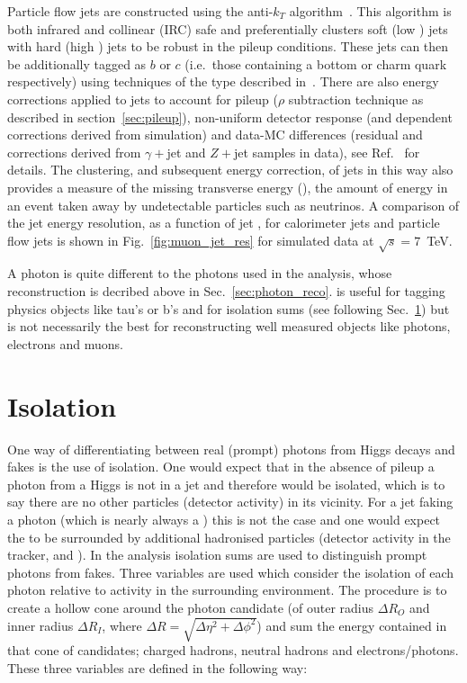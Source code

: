 Particle flow jets are constructed using the anti-$k_{T}$ algorithm~\cite{anti_kt_algo}. This algorithm is both infrared and collinear (IRC) safe and preferentially clusters soft (low \pT) jets with hard (high \pT) jets to be robust in the \LHC pileup conditions. These jets can then be additionally tagged as $b$ or $c$ (i.e.~those containing a bottom or charm quark respectively) using techniques of the type described in~\cite{b_tag}. There are also energy corrections applied to jets to account for pileup ($\rho$ subtraction technique as described in section~\ref{sec:pileup}), non-uniform detector response (\pT and \eta dependent corrections derived from \MC simulation) and data-MC differences (residual \pT and \eta corrections derived from $\gamma+$jet and $Z+$jet samples in data), see Ref.~\cite{jet_e_corrs} for details. The clustering, and subsequent energy correction, of jets in this way also provides a measure of the missing transverse energy (\MET), the amount of energy in an event taken away by undetectable particles such as neutrinos. A comparison of the jet energy resolution, as a function of jet \pT, for calorimeter jets and particle flow jets is shown in Fig.~\ref{fig:muon_jet_res} for simulated data at $\sqrt{s}=7$~TeV.

A \PF photon is quite different to the photons used in the analysis, whose reconstruction is decribed above in Sec.~\ref{sec:photon_reco}. \PF is useful for tagging physics objects like tau's or b's and for isolation sums (see following Sec.~\ref{sec:iso}) but is not necessarily the best for reconstructing well measured objects like photons, electrons and muons.

\section{Isolation}
\label{sec:iso}

One way of differentiating between real (prompt) photons from Higgs decays and fakes is the use of isolation. One would expect that in the absence of pileup a photon from a Higgs is not in a jet and therefore would be isolated, which is to say there are no other particles (detector activity) in its vicinity. For a jet faking a photon (which is nearly always a \pizero) this is not the case and one would expect the \pizero to be surrounded by additional hadronised particles (detector activity in the tracker, \ECAL and \HCAL). In the \CMS \Hgg analysis isolation sums are used to distinguish prompt photons from fakes. Three variables are used which consider the isolation of each photon relative to activity in the surrounding environment. The procedure is to create a hollow cone around the photon candidate (of outer radius $\Delta R_{O}$ and inner radius $\Delta R_{I}$, where $\Delta R = \sqrt{\Delta\eta^{2}+\Delta\phi^{2}}$) and sum the energy contained in that cone of \PF candidates; charged hadrons, neutral hadrons and electrons/photons. These three variables are defined in the following way:

